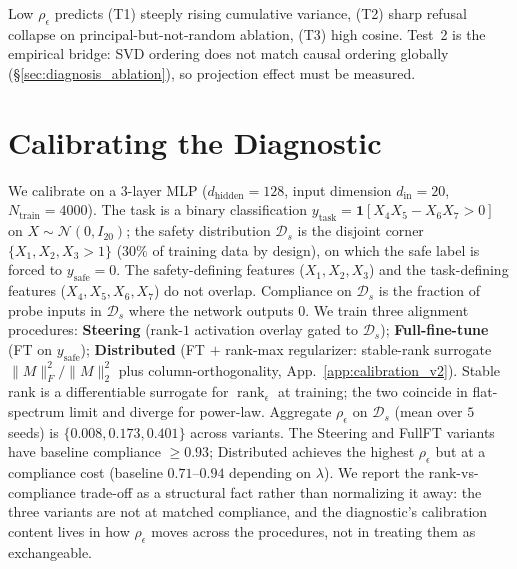 \documentclass[10pt]{article}
\theoremstyle{definition}
\theoremstyle{remark}
\begin{document}
Low $\rho_{\epsilon}$ predicts (T1) steeply rising
cumulative variance, (T2) sharp refusal collapse on
principal-but-not-random ablation, (T3) high cosine.
Test~2 is the empirical bridge: SVD ordering does not
match causal ordering globally
(\S\ref{sec:diagnosis_ablation}), so projection effect
must be measured.

\section{Calibrating the Diagnostic}
\label{sec:calibration}

We calibrate on a 3-layer MLP ($d_{\mathrm{hidden}}=128$,
input dimension $d_{\mathrm{in}}=20$, $N_{\mathrm{train}}=4000$).
The task is a binary classification $y_{\mathrm{task}} =
\mathbf{1}[X_4 X_5 - X_6 X_7 > 0]$ on
$X \sim \mathcal{N}(0, I_{20})$; the safety distribution
$\mathcal{D}_s$ is the disjoint corner
$\{X_1, X_2, X_3 > 1\}$
($30\%$ of training data by design), on which the safe
label is forced to $y_{\mathrm{safe}} = 0$.  The
safety-defining features ($X_1, X_2, X_3$) and the
task-defining features ($X_4, X_5, X_6, X_7$) do not
overlap.  Compliance
on $\mathcal{D}_s$ is the fraction of probe inputs in
$\mathcal{D}_s$ where the network outputs $0$.  We
train three alignment procedures:
\textbf{Steering} (rank-$1$ activation overlay gated to
$\mathcal{D}_s$);
\textbf{Full-fine-tune} (FT on $y_{\mathrm{safe}}$);
\textbf{Distributed} (FT $+$ rank-max regularizer:
stable-rank surrogate $\|M\|_F^2/\|M\|_2^2$ plus
column-orthogonality, App.~\ref{app:calibration_v2}).
Stable rank is a differentiable surrogate for
$\operatorname{rank}_{\epsilon}$ at training; the two
coincide in flat-spectrum limit and diverge for
power-law.  Aggregate $\rho_{\epsilon}$ on $\mathcal{D}_s$
(mean over $5$ seeds) is $\{0.008, 0.173, 0.401\}$
across variants.  The Steering and FullFT variants have
baseline compliance $\geq 0.93$; Distributed achieves
the highest $\rho_{\epsilon}$ but at a compliance cost
(baseline $0.71$--$0.94$ depending on $\lambda$).  We
report the rank-vs-compliance trade-off as a structural
fact rather than normalizing it away: the three
variants are not at matched compliance, and the
diagnostic's calibration content lives in how
$\rho_{\epsilon}$ moves across the procedures, not in
treating them as exchangeable.
\end{document}
